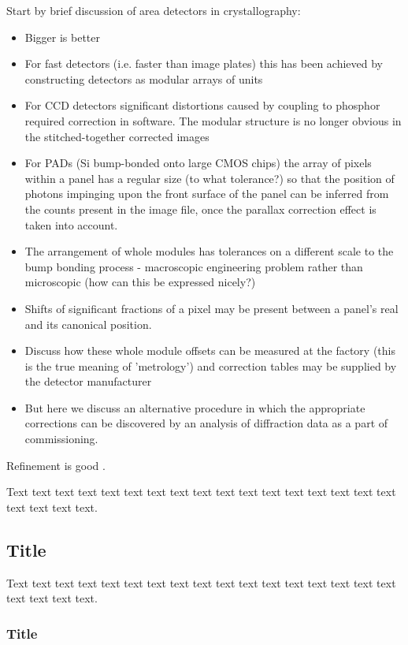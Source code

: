 \documentclass[preprint]{iucr}              %
\begin{document}
Start by brief discussion of area detectors in crystallography:

\begin{itemize}
  \item Bigger is better
  \item For fast detectors (i.e. faster than image plates) this has been
  achieved by constructing detectors as modular arrays of units
  \item For CCD detectors significant distortions caused by coupling to
  phosphor required correction in software. The modular structure is no
  longer obvious in the stitched-together corrected images
  \item For PADs (Si bump-bonded onto large CMOS chips) the array of pixels
  within a panel has a regular size (to what tolerance?) so that the
  position of photons impinging upon the front surface of the panel can be
  inferred from the counts present in the image file, once the parallax
  correction effect is taken into account.
  \item The arrangement of whole modules has tolerances on a different scale
  to the bump bonding process - macroscopic engineering problem rather than
  microscopic (how can this be expressed nicely?)
  \item Shifts of significant fractions of a pixel may be present between a
  panel's real and its canonical position.
  \item Discuss how these whole module offsets can be measured at the
  factory (this is the true meaning of 'metrology') and correction tables
  may be supplied by the detector manufacturer
  \item But here we discuss an alternative procedure in which the
  appropriate corrections can be discovered by an analysis of diffraction
  data as a part of commissioning.
\end{itemize}

Refinement is good \cite{Waterman2016}.

Text text text text text text text text text text text text text text
text text text text text text text.

\subsection{Title}

Text text text text text text text text text text text text text text
text text text text text text text.

\subsubsection{Title}
\end{document}
